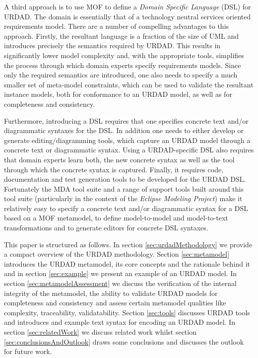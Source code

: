 A third approach is to use MOF to define a {\em Domain Specific Language} (DSL) for URDAD. The domain is essentially that of a technology neutral services oriented requirements model. There are a number of compelling advantages to this approach. Firstly, the resultant language is a fraction of the size of UML and introduces precisely the semantics required by URDAD. This results in significantly lower model complexity and, with the appropriate tools, simplifies the process through which domain experts specify requirements models. Since only the required semantics are introduced, one also needs to specify a much smaller set of meta-model constraints, which can be used to validate the resultant instance models, both for conformance to an URDAD model, as well as for completeness and consistency.

Furthermore, introducing a DSL requires that one specifies concrete text and/or diagrammatic syntaxes for the DSL. In addition one needs to either develop or generate editing/diagramming tools, which capture an URDAD model through a concrete text or diagrammatic syntax. Using a URDAD-specific DSL also requires that domain experts learn both, the new concrete syntax as well as the tool through which the concrete syntax is captured. Finally, it requires code, documentation and test generation tools to be developed for the URDAD DSL. Fortunately the MDA tool suite and a range of support tools built around this tool suite (particularly in the context of the {\em Eclipse Modeling Project}) make it relatively easy to specify a concrete text and/or diagrammatic syntax for a DSL based on a MOF metamodel, to define model-to-model and model-to-text transformations and to generate editors for concrete DSL syntaxes.

This paper is structured as follows. In section \ref{sec:urdadMethodology} we provide a compact overview of the URDAD methodology. Section \ref{sec:metamodel} introduces the URDAD metamodel, its core concepts and the rationale behind it and in section \ref{sec:example} we present an example of an URDAD model. In section \ref{sec:metamodelAssessment} we discuss the verification of the internal integrity of the metamodel, the ability to validate URDAD models for completeness and consistency and assess certain metamodel qualities like complexity, traceability, validatability. Section \ref{sec:tools} discusses URDAD tools and introduces and example text syntax for encoding an URDAD model. In section \ref{sec:relatedWork} we discuss related work whilst section \ref{sec:conclusionsAndOutlook} draws some conclusions and discusses the outlook for future work.

